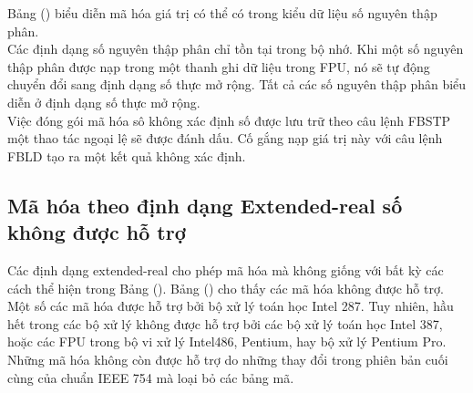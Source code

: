 		Bảng () biểu diễn mã hóa giá trị có thể có trong kiểu dữ liệu số nguyên thập phân.\\
	
		Các định dạng số nguyên thập phân chỉ tồn tại trong bộ nhớ. Khi một số nguyên thập phân được nạp trong một thanh ghi dữ liệu trong FPU, nó sẽ tự động chuyển đổi sang định dạng số thực mở rộng. Tất cả các số nguyên thập phân biểu diễn ở định dạng số thực mở rộng.\\
		
		Việc đóng gói mã hóa sô không xác định số được lưu trữ theo câu lệnh FBSTP một thao tác ngoại lệ sẽ được đánh dấu. Cố gắng nạp giá trị này với câu lệnh FBLD tạo ra một kết quả không xác định.

		\subsection*{Mã hóa theo định dạng Extended-real số không được hỗ trợ}
		Các định dạng extended-real cho phép mã hóa mà không giống với bất kỳ các cách thể hiện trong Bảng (). Bảng () cho thấy các mã hóa không được hỗ trợ. Một số các mã hóa được hỗ trợ bởi bộ xử lý toán học Intel 287. Tuy nhiên, hầu hết trong các bộ xử lý không được hỗ trợ bởi các bộ xử lý toán học Intel 387, hoặc các FPU trong bộ vi xử lý Intel486, Pentium, hay bộ xử lý Pentium Pro. Những mã hóa không còn được hỗ trợ do những thay đổi trong phiên bản cuối cùng của chuẩn IEEE 754 mà loại bỏ các bảng mã.\\
	

